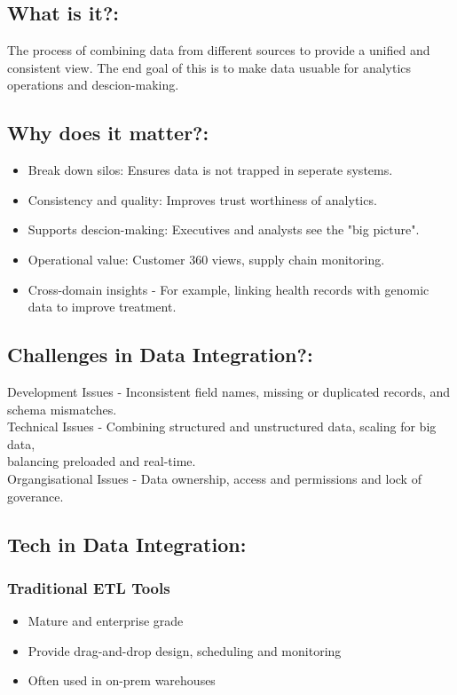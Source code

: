 \documentclass[a5paper]{article}
\begin{document}
	\subsection{What is it?:}
	The process of combining data from different sources to provide a unified and consistent view. The end goal of this is to make data usuable for analytics operations and descion-making.
	\subsection{Why does it matter?:}
	\begin{itemize}
		\item Break down silos: Ensures data is not trapped in seperate systems.
		\item Consistency and quality: Improves trust worthiness of analytics.
		\item Supports descion-making: Executives and analysts see the "big picture".
		\item Operational value: Customer 360 views, supply chain monitoring.
		\item Cross-domain insights - For example, linking health records with genomic data to improve treatment.
	\end{itemize}
	\subsection{Challenges in Data Integration?:}
	Development Issues - Inconsistent field names, missing or duplicated records, and schema mismatches.\\
	Technical Issues - Combining structured and unstructured data, scaling for big data,\\balancing preloaded and real-time.\\
	Organgisational Issues - Data ownership, access and permissions and lock of goverance.
	\subsection{Tech in Data Integration:}
	\subsubsection{Traditional ETL Tools}
	\begin{itemize}
		\item Mature and enterprise grade
		\item Provide drag-and-drop design, scheduling and monitoring
		\item Often used in on-prem warehouses
	\end{itemize}
\end{document}
